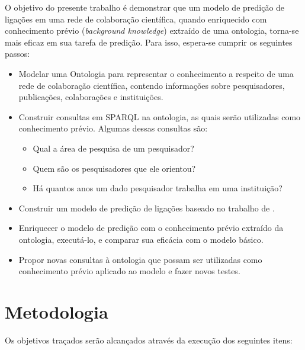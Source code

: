 O objetivo do presente trabalho é demonstrar que um modelo de predição de ligações em uma rede de colaboração científica, quando enriquecido com conhecimento prévio (\textit{background knowledge}) extraído de uma ontologia, torna-se mais eficaz em sua tarefa de predição.
Para isso, espera-se cumprir os seguintes passos:

\begin{itemize}
    \item Modelar uma Ontologia para representar o conhecimento a respeito de uma rede de colaboração científica, contendo informações sobre pesquisadores, publicações, colaborações e instituições.
    \item Construir consultas em SPARQL na ontologia, as quais serão utilizadas como conhecimento prévio. Algumas dessas consultas são:
    \begin{itemize}
        \item Qual a área de pesquisa de um pesquisador?
        \item Quem são os pesquisadores que  ele orientou?
        \item Há quantos anos um dado pesquisador trabalha em uma instituição?
    \end{itemize}
    \item Construir um modelo de predição de ligações baseado no trabalho de \citet{Cervantes2014}.
    \item Enriquecer o modelo de predição com o conhecimento prévio extraído da ontologia, executá-lo, e comparar sua eficácia com o modelo básico.
    \item Propor novas consultas à ontologia que possam ser utilizadas como conhecimento prévio aplicado ao modelo e fazer novos testes.
\end{itemize}

\section{Metodologia}
\label{sec:metodologia}

Os objetivos traçados serão alcançados através da execução dos seguintes itens:


